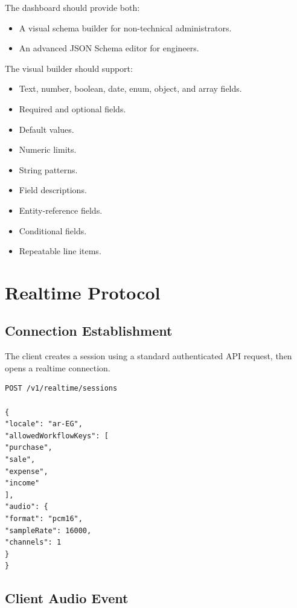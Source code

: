 \documentclass[11pt,a4paper]{article}
\begin{document}
The dashboard should provide both:

\begin{itemize}
\item A visual schema builder for non-technical administrators.
\item An advanced JSON Schema editor for engineers.
\end{itemize}

The visual builder should support:

\begin{itemize}
\item Text, number, boolean, date, enum, object, and array fields.
\item Required and optional fields.
\item Default values.
\item Numeric limits.
\item String patterns.
\item Field descriptions.
\item Entity-reference fields.
\item Conditional fields.
\item Repeatable line items.
\end{itemize}

\section{Realtime Protocol}

\subsection{Connection Establishment}

The client creates a session using a standard authenticated API request,
then opens a realtime connection.

\begin{lstlisting}[language={},caption={Create a voice session}]
POST /v1/realtime/sessions

{
"locale": "ar-EG",
"allowedWorkflowKeys": [
"purchase",
"sale",
"expense",
"income"
],
"audio": {
"format": "pcm16",
"sampleRate": 16000,
"channels": 1
}
}
\end{lstlisting}

\subsection{Client Audio Event}
\end{document}
